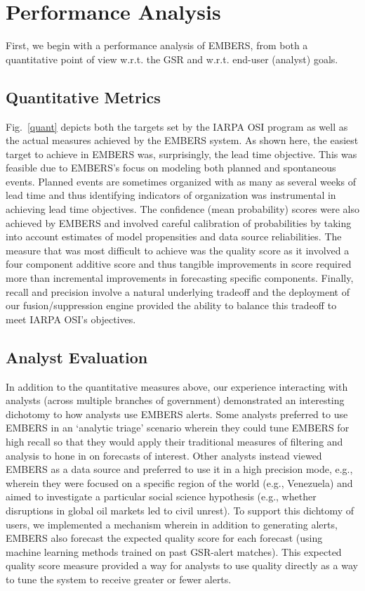 \section{Performance Analysis}
First, we begin with a performance analysis of EMBERS, from both a quantitative point of view w.r.t.
the GSR and w.r.t. end-user (analyst) goals.
\subsection{Quantitative Metrics}
Fig.~\ref{quant} depicts both the targets set by the IARPA OSI program as well as the
actual measures achieved by the EMBERS system. As shown here, the easiest target to achieve
in EMBERS was, surprisingly, the lead time objective. This was feasible due to EMBERS's focus on modeling
both planned and spontaneous events. Planned events are sometimes organized with as many as several weeks
of lead time and thus identifying indicators of organization was instrumental in achieving
lead time objectives. The confidence (mean probability) scores were also achieved by EMBERS and involved
careful calibration of probabilities by taking into account estimates of
model propensities and data source reliabilities. The measure that was most difficult to achieve
was the quality score as it involved a four component additive score and thus tangible improvements in
score required more than incremental improvements in forecasting specific components. Finally, recall
and precision involve a natural underlying tradeoff and the deployment of our fusion/suppression
engine provided the ability to balance this tradeoff to meet IARPA OSI's objectives.


\subsection{Analyst Evaluation}
In addition to the quantitative measures above, our experience interacting with analysts (across multiple
branches of government) demonstrated
an interesting dichotomy to how analysts use EMBERS alerts. Some analysts preferred to use EMBERS in an
`analytic triage' scenario wherein they could tune EMBERS for high recall so that they would apply their
traditional measures of filtering and analysis to hone in on forecasts of interest. Other analysts 
instead viewed EMBERS as a data source and preferred to use it in a high precision mode, e.g., wherein they
were focused on a specific region of the world (e.g., Venezuela) and aimed to investigate a particular
social science hypothesis (e.g., whether disruptions in global oil markets led to civil unrest). 
To support this dichtomy of users, we implemented a mechanism wherein in addition to generating alerts, EMBERS
also forecast the expected quality score for each forecast (using machine learning methods trained on
past GSR-alert matches). This expected quality score measure provided a way for analysts to use quality
directly as a way to tune the system to receive greater or fewer alerts.


